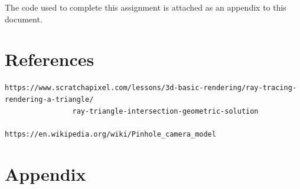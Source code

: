 \documentclass{article}
\begin{document}
The code used to complete this assignment is attached as an appendix to this document.

\section{References}
\begin{lstlisting}
https://www.scratchapixel.com/lessons/3d-basic-rendering/ray-tracing-rendering-a-triangle/
                ray-triangle-intersection-geometric-solution

https://en.wikipedia.org/wiki/Pinhole_camera_model
\end{lstlisting}

\newpage
\onecolumn
\section{Appendix}



\end{document}
